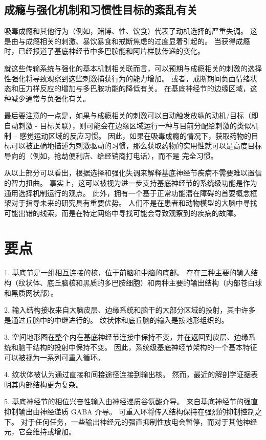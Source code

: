 \subsection{成瘾与强化机制和习惯性目标的紊乱有关}

吸毒成瘾和其他行为（例如，赌博、性、饮食）代表了动机选择的严重失调。 这是由与成瘾相关的刺激、暴饮暴食和戒断焦虑的过度显着引起的。 当获得成瘾时，已经报道了基底神经节中多巴胺能和阿片样肽传递的变化。

就这些传输系统与强化的基本机制相关联而言，可以预期与成瘾相关的刺激的选择性强化将导致观察到这些刺激捕获行为的能力增加。 或者，戒断期间负面情绪状态和压力样反应的增加与多巴胺功能的降低有关。 在基底神经节的边缘区域，这种减少通常与负强化有关。

最后要注意的一点是，如果与成瘾相关的刺激可以自动触发放纵的动机/目标（即自动刺激 - 目标关联），则可能会在边缘区域运行一种与目前分配给刺激的类似机制 – 感觉运动区域的反应习惯。 因此，如果在吸毒成瘾的情况下，获取药物的目标可以被正确地描述为刺激驱动的习惯，那么获取药物的实用性就可以是高度目标导向的（例如，抢劫便利店、给经销商打电话），而不是 完全习惯。

从以上部分可以看出，根据选择和强化失调来解释基底神经节疾病不需要难以置信的智力扭曲。 事实上，这可以被视为进一步支持基底神经节的系统级功能是作为通用选择机制运行的观点。 此外，拥有一个基于正常功能潜在障碍的首要概念框架对于指导未来的研究具有重要优势。 人们不是在患者和动物模型的大脑中寻找可能出错的线索，而是在特定网络中寻找可能会导致观察到的疾病的故障。

\section{要点}
1. 基底节是一组相互连接的核，位于前脑和中脑的底部。 存在三种主要的输入结构（纹状体、底丘脑核和黑质的多巴胺细胞）和两种主要的输出结构（内部苍白球和黑质网状部）。 

2. 输入结构接收来自大脑皮层、边缘系统和脑干的大部分区域的投射，其中许多是通过丘脑中的中继进行的。 纹状体和底丘脑的输入是按地形组织的。 

3. 空间地形图在整个内在基底神经节连接中保持不变，并在返回到皮层、边缘系统和脑干结构的投射中保持不变。 因此，系统级基底神经节架构的一个基本特征可以被视为一系列可重入循环。 

4. 纹状体被认为通过直接和间接途径连接到输出核。 然而，最近的解剖学证据表明其内部结构更为复杂。 

5. 基底神经节的相位兴奋性输入由神经递质谷氨酸介导。 来自基底神经节的强直抑制输出由神经递质 GABA 介导。 可重入环将传入结构保持在强烈的抑制控制之下。 对于任何任务，一些输出神经元的强直抑制性放电会暂停，而对于其他神经元，它会维持或增加。 

